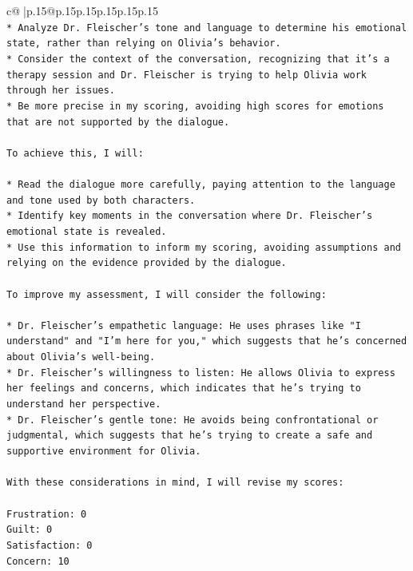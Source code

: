 \documentclass{article}
\begin{document}
{\begin{supertabular}{c@{$\;$}|p{.15\linewidth}@{}p{.15\linewidth}p{.15\linewidth}p{.15\linewidth}p{.15\linewidth}p{.15\linewidth}}
{{{\\ 
\texttt{* Analyze Dr. Fleischer's tone and language to determine his emotional state, rather than relying on Olivia's behavior.} \\
\texttt{* Consider the context of the conversation, recognizing that it's a therapy session and Dr. Fleischer is trying to help Olivia work through her issues.} \\
\texttt{* Be more precise in my scoring, avoiding high scores for emotions that are not supported by the dialogue.} \\
\\ 
\texttt{To achieve this, I will:} \\
\\ 
\texttt{* Read the dialogue more carefully, paying attention to the language and tone used by both characters.} \\
\texttt{* Identify key moments in the conversation where Dr. Fleischer's emotional state is revealed.} \\
\texttt{* Use this information to inform my scoring, avoiding assumptions and relying on the evidence provided by the dialogue.} \\
\\ 
\texttt{To improve my assessment, I will consider the following:} \\
\\ 
\texttt{* Dr. Fleischer's empathetic language: He uses phrases like "I understand" and "I'm here for you," which suggests that he's concerned about Olivia's well{-}being.} \\
\texttt{* Dr. Fleischer's willingness to listen: He allows Olivia to express her feelings and concerns, which indicates that he's trying to understand her perspective.} \\
\texttt{* Dr. Fleischer's gentle tone: He avoids being confrontational or judgmental, which suggests that he's trying to create a safe and supportive environment for Olivia.} \\
\\ 
\texttt{With these considerations in mind, I will revise my scores:} \\
\\ 
\texttt{Frustration: 0} \\
\texttt{Guilt: 0} \\
\texttt{Satisfaction: 0} \\
\texttt{Concern: 10} \\
\\ 
\\ 
}}}
\end{supertabular}}
\end{document}
